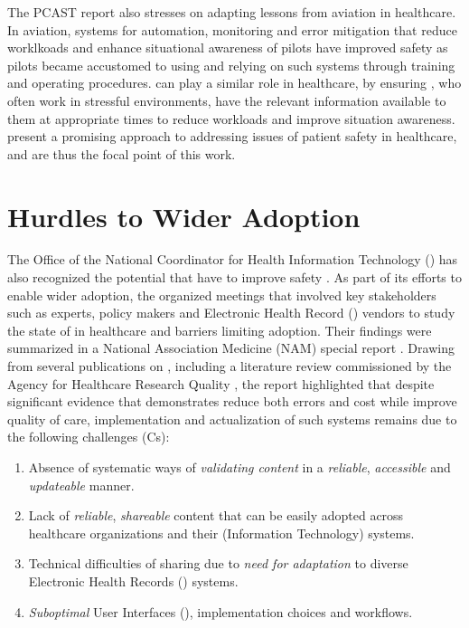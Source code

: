 The PCAST report also stresses on adapting lessons from aviation in healthcare.
In aviation, systems for automation, monitoring and error mitigation that
reduce worklkoads and enhance situational awareness of pilots have
improved safety as pilots became accustomed to using and relying on such
systems through training and operating procedures. \CDSSs{} can play a similar
role in healthcare, by ensuring \HCPs{}, who often work in stressful
environments, have the relevant information available to them at appropriate
times to reduce workloads and improve situation awareness. \CDSSs{}
present a promising approach to addressing issues of patient safety in
healthcare, and are thus the focal point of this work.

\section{Hurdles to Wider \CDSS{} Adoption}\label{sec:hurdles-cdss-adoption}

The Office of the National Coordinator for Health Information Technology
(\ONC{}) \cite{ONCUrl} has also recognized the potential that \CDSS{} have to
improve safety \cite{ONCCDSUrl}. As part of its efforts to enable wider
\CDSS{} adoption, the \ONC{} organized meetings that involved key stakeholders
such as \CDSS{} experts, policy makers and Electronic Health
Record (\EHR{}) vendors to study the state of \CDSS{} in healthcare and barriers
limiting adoption. Their findings were summarized in a National Association Medicine (NAM) special
report \cite{Nam17}. Drawing from several publications on \CDSSs{}, including a
literature review commissioned by the Agency for Healthcare Research Quality \cite{BrightAIM12},
the report highlighted that despite significant evidence that demonstrates
\CDSSs{} reduce both errors and cost while improve quality of care,
implementation and actualization of such systems remains  due to
the following challenges (Cs):

\begin{enumerate}[label=C\arabic*.]
\itemsep0.0em
\item Absence of systematic ways of \emph{validating content}
in a \emph{reliable}, \emph{accessible} and \emph{updateable} manner.
\item Lack of \emph{reliable}, \emph{shareable} \CDSS{} content
that can be easily adopted across healthcare organizations and their (Information
Technology) \IT{} systems.
\item Technical difficulties of sharing due to \emph{need for
  adaptation} to diverse Electronic Health Records (\EHR) systems.
\item \emph{Suboptimal} User Interfaces (\UIs), implementation choices and
workflows.
\end{enumerate}

